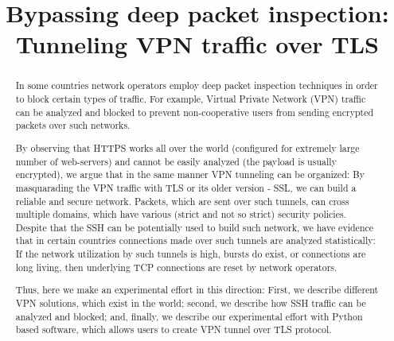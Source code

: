 \documentclass[conference,10pt,letter]{IEEEtran}
\begin{document}
\sloppy
\title{Bypassing deep packet inspection: Tunneling VPN traffic over TLS}
\maketitle
\begin{abstract}

In some countries network operators employ deep packet inspection techniques 
in order to block certain types of traffic. For example, Virtual Private Network 
(VPN) traffic can be analyzed and blocked to prevent non-cooperative users from 
sending encrypted packets over such networks. 

By observing that HTTPS works all over the world (configured for extremely large
number of web-servers) and cannot be easily analyzed (the payload is usually encrypted),
we argue that in the same manner VPN tunneling can be organized: By masquarading 
the VPN traffic with TLS or its older version - SSL, we can build a reliable and 
secure network. Packets, which are sent over such tunnels, can cross multiple
domains, which have various (strict and not so strict) security policies. 
Despite that the SSH can be potentially used to build such network, 
we have evidence that in certain countries connections
made over such tunnels are analyzed statistically: If the network utilization by 
such tunnels is high, bursts do exist, or connections are long living, then 
underlying TCP connections are reset by network operators. 

Thus, here we make an experimental effort in this direction: 
First, we describe different VPN solutions, which exist in the world;
second, we describe how SSH traffic can be analyzed and blocked; and,
finally, we describe our experimental effort with Python based software,
which allows users to create VPN tunnel over TLS protocol. 

\end{abstract}







\end{document}
